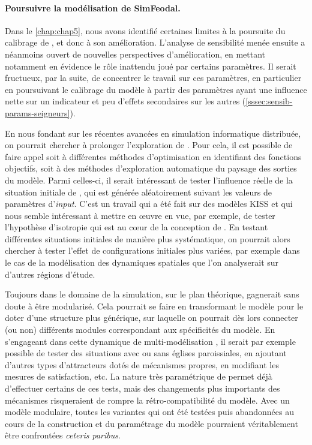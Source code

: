 \paragraph{Poursuivre la modélisation de SimFeodal.}
Dans le \cref{chap:chap5}, nous avons identifié certaines limites à la poursuite du calibrage de \simfeodal{}, et donc à son amélioration.
L'analyse de sensibilité menée ensuite a néanmoins ouvert de nouvelles perspectives d'amélioration, en mettant notamment en évidence le rôle inattendu joué par certains paramètres.
Il serait fructueux, par la suite, de concentrer le travail sur ces paramètres, en particulier en poursuivant le calibrage du modèle à partir des paramètres ayant une influence nette sur un indicateur et peu d'effets secondaires sur les autres (\cref{sssec:sensib-params-seigneurs}). 

En nous fondant sur les récentes avancées en simulation informatique distribuée, on pourrait chercher à prolonger l'exploration de \simfeodal{}.
Pour cela, il est possible de faire appel soit à différentes méthodes d'optimisation en identifiant des \og fonctions objectifs\fg{}, soit à des méthodes d'exploration automatique du paysage des sorties du modèle.
Parmi celles-ci, il serait intéressant de tester l'influence réelle de la situation initiale de \simfeodal{}, qui est générée aléatoirement suivant les valeurs de paramètres d'\textit{input}.
C'est un travail qui a été fait sur des modèles KISS \autocite{raimbault_space_2019} et qui nous semble intéressant à mettre en œuvre en vue, par exemple, de tester l'hypothèse d'isotropie qui est au cœur de la conception de \simfeodal{}.
En testant différentes situations initiales de manière plus systématique, on pourrait alors chercher à tester l'effet de configurations initiales plus variées, par exemple dans le cas de la modélisation des dynamiques spatiales que l'on analyserait sur d'autres régions d'étude.

Toujours dans le domaine de la simulation, sur le plan théorique, \simfeodal{} gagnerait sans doute à être \og modularisé\fg{}.
Cela pourrait se faire en transformant le modèle pour le doter d'une structure plus générique, sur laquelle on pourrait dès lors connecter (ou non) différents \og modules\fg{} correspondant aux spécificités du modèle.
En s'engageant dans cette dynamique de multi-modélisation \autocite{cottineau_chapter_2019}, il serait par exemple possible de tester des situations avec ou sans églises paroissiales, en ajoutant d'autres types d'attracteurs dotés de mécanismes propres, en modifiant les mesures de satisfaction, etc.
La nature très paramétrique de \simfeodal{} permet déjà d'effectuer certains de ces tests, mais des changements plus importants des mécanismes risqueraient de rompre la rétro-compatibilité du modèle.
Avec un modèle modulaire, toutes les variantes qui ont été testées puis abandonnées au cours de la construction et du paramétrage du modèle pourraient véritablement être confrontées \textit{ceteris paribus}.

